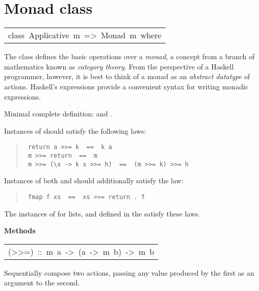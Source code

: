 \section{Monad class
}
\begin{haddockdesc}
\item[\begin{tabular}{@{}l}
class\ Applicative\ m\ =>\ Monad\ m\ where
\end{tabular}]\haddockbegindoc
The  class defines the basic operations over a \emph{monad},
a concept from a branch of mathematics known as \emph{category theory}.
From the perspective of a Haskell programmer, however, it is best to
think of a monad as an \emph{abstract datatype} of actions.
Haskell's  expressions provide a convenient syntax for writing
monadic expressions.
\par
Minimal complete definition: \haddockid{>>=} and .
\par
Instances of  should satisfy the following laws:
\par
\begin{quote}
{\haddockverb\begin{verbatim}
 return a >>= k  ==  k a
 m >>= return  ==  m
 m >>= (\x -> k x >>= h)  ==  (m >>= k) >>= h
\end{verbatim}}
\end{quote}
Instances of both  and  should additionally satisfy the law:
\par
\begin{quote}
{\haddockverb\begin{verbatim}
 fmap f xs  ==  xs >>= return . f
\end{verbatim}}
\end{quote}
The instances of  for lists,  and 
defined in the  satisfy these laws.
\par

\haddockpremethods{}\textbf{Methods}
\begin{haddockdesc}
\item[\begin{tabular}{@{}l}
(>>=)\ ::\ m\ a\ ->\ (a\ ->\ m\ b)\ ->\ m\ b
\end{tabular}]\haddockbegindoc
Sequentially compose two actions, passing any value produced
 by the first as an argument to the second.
\par


\end{haddockdesc}
\end{haddockdesc}
